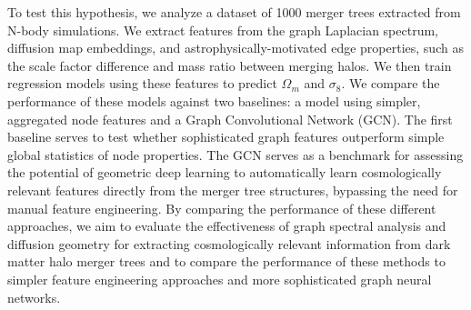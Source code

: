 \documentclass[twocolumn]{aastex631}
\begin{document}
To test this hypothesis, we analyze a dataset of 1000 merger trees extracted from N-body simulations. We extract features from the graph Laplacian spectrum, diffusion map embeddings, and astrophysically-motivated edge properties, such as the scale factor difference and mass ratio between merging halos. We then train regression models using these features to predict $\Omega_m$ and $\sigma_8$. We compare the performance of these models against two baselines: a model using simpler, aggregated node features and a Graph Convolutional Network (GCN). The first baseline serves to test whether sophisticated graph features outperform simple global statistics of node properties. The GCN serves as a benchmark for assessing the potential of geometric deep learning to automatically learn cosmologically relevant features directly from the merger tree structures, bypassing the need for manual feature engineering. By comparing the performance of these different approaches, we aim to evaluate the effectiveness of graph spectral analysis and diffusion geometry for extracting cosmologically relevant information from dark matter halo merger trees and to compare the performance of these methods to simpler feature engineering approaches and more sophisticated graph neural networks.
\end{document}
